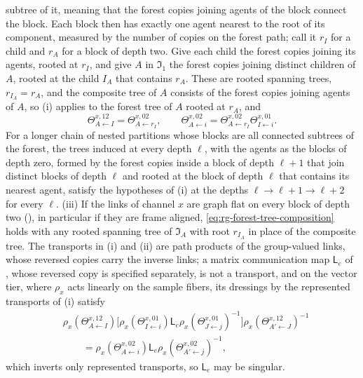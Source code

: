 subtree of it, meaning that the forest copies joining agents of the block connect the block. Each block then
has exactly one agent nearest to the root of its component, measured by the number of copies on the forest
path; call it $r_I$ for a child and $r_A$ for a block of depth two. Give each child the forest copies joining
its agents, rooted at $r_I$, and give $A$ in $\mathfrak I_1$ the forest copies joining distinct children of
$A$, rooted at the child $I_A$ that contains $r_A$. These are rooted spanning trees, $r_{I_A}=r_A$, and the
composite tree of $A$ consists of the forest copies joining agents of $A$, so (i) applies to the forest tree
of $A$ rooted at $r_A$, and
\begin{equation}
\Theta^{x,12}_{A\leftarrow I}=\Theta^{x,02}_{A\leftarrow r_I},
\qquad
\Theta^{x,02}_{A\leftarrow i}=\Theta^{x,02}_{A\leftarrow r_I}\Theta^{x,01}_{I\leftarrow i}.
\label{eq:rg-forest-root-factorization}
\end{equation}
For a longer chain of nested partitions whose blocks are all connected subtrees of the forest, the trees
induced at every depth $\ell$, with the agents as the blocks of depth zero, formed by the forest copies
inside a block of depth $\ell+1$ that join distinct blocks of depth $\ell$ and rooted at the block of depth
$\ell$ that contains its nearest agent, satisfy the hypotheses of (i) at the depths $\ell\to\ell+1\to\ell+2$
for every $\ell$. (iii) If the links of channel $x$ are graph flat on every block of depth two
(), in particular if they are frame aligned,
\eqref{eq:rg-forest-tree-composition} holds with any rooted spanning tree of $\mathfrak I_A$ with root
$r_{I_A}$ in place of the composite tree. The transports in (i) and (ii) are path products of the
group-valued links, whose reversed copies carry the inverse links; a matrix communication
map $\mathsf L_e$ of , whose reversed copy is specified separately, is
not a transport, and on the vector tier, where $\rho_x$ acts linearly on the sample fibers, its dressings by
the represented transports of (i) satisfy
\begin{equation}
\begin{aligned}
&\rho_x(\Theta^{x,12}_{A\leftarrow I})\bigl[\rho_x(\Theta^{x,01}_{I\leftarrow i})\mathsf L_e
\rho_x(\Theta^{x,01}_{J\leftarrow j})^{-1}\bigr]\rho_x(\Theta^{x,12}_{A'\leftarrow J})^{-1}\\
&\qquad=\rho_x(\Theta^{x,02}_{A\leftarrow i})\mathsf L_e\rho_x(\Theta^{x,02}_{A'\leftarrow j})^{-1},
\end{aligned}
\label{eq:rg-forest-matrix-dressing}
\end{equation}
which inverts only represented transports, so $\mathsf L_e$ may be singular. 

